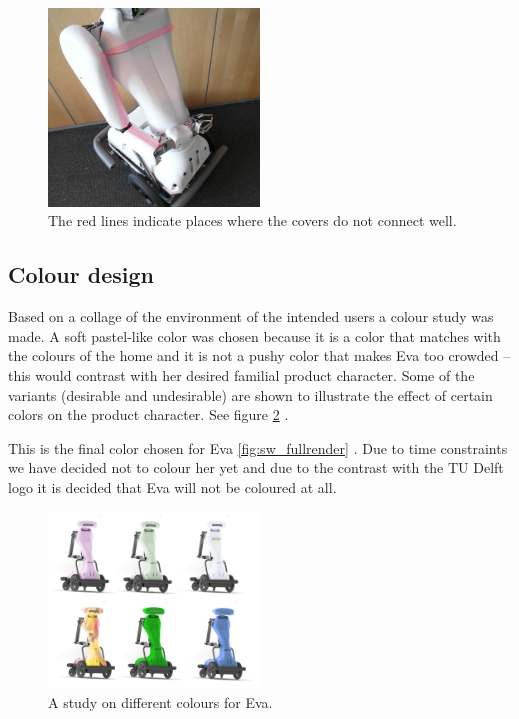 \documentclass[technical_document.tex]{subfiles}
\begin{document}
\begin{figure}[h]
	\centering
	\mbox{\includegraphics[width=0.5\textwidth]{Images/nonconnectingmodelsurfaces.png}}
	\caption{The red lines indicate places where the covers do not connect well.}
	\label{fig:connect}
\end{figure}

\subsection*{Colour design}

Based on a collage of the environment of the intended users a colour study was made. A soft pastel-like color was chosen because it is a color that matches with the colours of the home and it is not a pushy color that makes Eva too crowded – this would contrast with her desired familial product character. Some of the variants (desirable and undesirable) are shown to illustrate the effect of certain colors on the product character. See figure \ref{fig:character} .

This is the final color chosen for Eva \ref{fig:sw_fullrender} . Due to time constraints we have decided not to colour her yet and due to the contrast with the TU Delft logo it is decided that Eva will not be coloured at all.
 
\begin{figure}[h]
	\centering
	\mbox{\includegraphics[width=0.5\textwidth]{Images/colorstudy.png}}
	\caption{A study on different colours for Eva.}
	\label{fig:character}
\end{figure}
\end{document}
